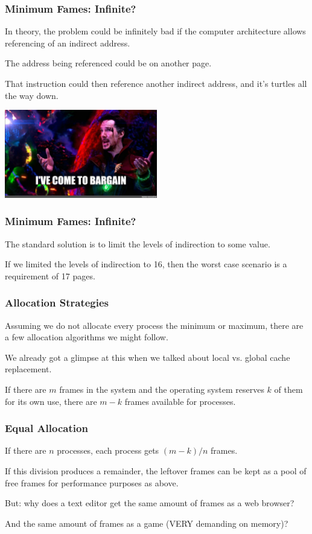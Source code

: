 \begin{frame}
\frametitle{Minimum Fames: Infinite?}

In theory, the problem could be infinitely bad if the computer architecture allows referencing of an indirect address. 

The address being referenced could be on another page. 

That instruction could then reference another indirect address, and it's turtles all the way down.

\begin{center}
	\includegraphics[width=0.5\textwidth]{images/bargain.jpg}
\end{center}

\end{frame}

\begin{frame}
\frametitle{Minimum Fames: Infinite?}

The standard solution is to limit the levels of indirection to some value.

If we limited the levels of indirection to 16, then the worst case scenario is a requirement of 17 pages.

\end{frame}

\begin{frame}
\frametitle{Allocation Strategies}

Assuming we do not allocate every process the minimum or maximum, there are a few allocation algorithms we might follow. 

We already got a glimpse at this when we talked about local vs. global cache replacement.

If there are $m$ frames in the system and the operating system reserves $k$ of them for its own use, there are $m-k$ frames available for processes.

\end{frame}

\begin{frame}
\frametitle{Equal Allocation}

If there are $n$ processes, each process gets $(m-k)/n$ frames. 

If this division produces a remainder, the leftover frames can be kept as a pool of free frames for performance purposes as above. 

But: why does a text editor get the same amount of frames as a web browser?

And the same amount of frames as a game (VERY demanding on memory)?


\end{frame}

